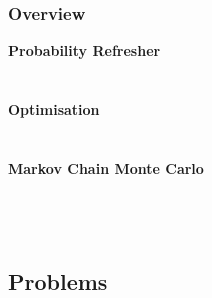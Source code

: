 	\begin{frame}
		\frametitle{Overview}
		\bfseries{Probability Refresher}\\[1.5pt]
		\hspace*{3ex}\\
		\hspace*{3ex}\\[3.0pt]
		\bfseries{Optimisation}\\[1.5pt]
		\hspace*{3ex}\\
		\hspace*{3ex}\\[3.0pt]
		\bfseries{Markov Chain Monte Carlo}\\[1.5pt]
		\hspace*{3ex}\\
		\hspace*{3ex}\\
		\hspace*{3ex}\\[3.0pt]
	\end{frame}

	\subsection{Problems}

